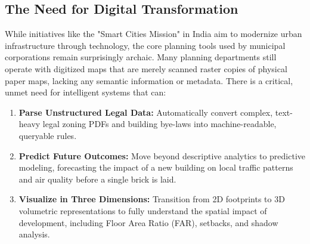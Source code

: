\documentclass[12pt,a4paper]{report}
\begin{document}
\subsection{The Need for Digital Transformation}
While initiatives like the "Smart Cities Mission" in India aim to modernize urban infrastructure through technology, the core planning tools used by municipal corporations remain surprisingly archaic. Many planning departments still operate with digitized maps that are merely scanned raster copies of physical paper maps, lacking any semantic information or metadata. There is a critical, unmet need for intelligent systems that can:
\begin{enumerate}
    \item \textbf{Parse Unstructured Legal Data:} Automatically convert complex, text-heavy legal zoning PDFs and building bye-laws into machine-readable, queryable rules.
    \item \textbf{Predict Future Outcomes:} Move beyond descriptive analytics to predictive modeling, forecasting the impact of a new building on local traffic patterns and air quality before a single brick is laid.
    \item \textbf{Visualize in Three Dimensions:} Transition from 2D footprints to 3D volumetric representations to fully understand the spatial impact of development, including Floor Area Ratio (FAR), setbacks, and shadow analysis.
\end{enumerate}
\end{document}
